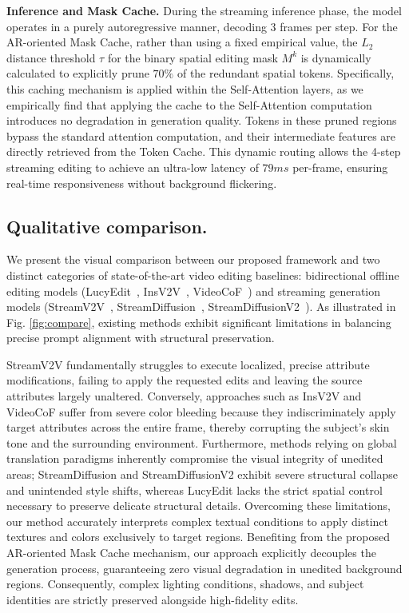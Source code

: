 \documentclass{llmxive}
\begin{document}
\noindent \textbf{Inference and Mask Cache.} During the streaming inference phase, the model operates in a purely autoregressive manner, decoding 3 frames per step. For the AR-oriented Mask Cache, rather than using a fixed empirical value, the $L_2$ distance threshold $\tau$ for the binary spatial editing mask $M^k$ is dynamically calculated to explicitly prune $70\%$ of the redundant spatial tokens. Specifically, this caching mechanism is applied within the Self-Attention layers, as we empirically find that applying the cache to the Self-Attention computation introduces no degradation in generation quality. Tokens in these pruned regions bypass the standard attention computation, and their intermediate features are directly retrieved from the Token Cache. This dynamic routing allows the 4-step streaming editing to achieve an ultra-low latency of $79ms$ per-frame, ensuring real-time responsiveness without background flickering.


\subsection{Qualitative comparison.}


\label{subsec:qualitative_comparison}

We present the visual comparison between our proposed framework and two distinct categories of state-of-the-art video editing baselines: bidirectional offline editing models (LucyEdit~\cite{decart2025lucyedit}, InsV2V~\cite{cheng2023consistent}, VideoCoF~\cite{yang2025unified}) and streaming generation models (StreamV2V~\cite{liang2024looking}, StreamDiffusion~\cite{kodaira2025streamdiffusion}, StreamDiffusionV2~\cite{feng2025streamdiffusionv2}). As illustrated in Fig. \ref{fig:compare}, existing methods exhibit significant limitations in balancing precise prompt alignment with structural preservation.

StreamV2V fundamentally struggles to execute localized, precise attribute modifications, failing to apply the requested edits and leaving the source attributes largely unaltered. Conversely, approaches such as InsV2V and VideoCoF suffer from severe color bleeding because they indiscriminately apply target attributes across the entire frame, thereby corrupting the subject's skin tone and the surrounding environment. Furthermore, methods relying on global translation paradigms inherently compromise the visual integrity of unedited areas; StreamDiffusion and StreamDiffusionV2 exhibit severe structural collapse and unintended style shifts, whereas LucyEdit lacks the strict spatial control necessary to preserve delicate structural details. Overcoming these limitations, our method accurately interprets complex textual conditions to apply distinct textures and colors exclusively to target regions. Benefiting from the proposed AR-oriented Mask Cache mechanism, our approach explicitly decouples the generation process, guaranteeing zero visual degradation in unedited background regions. Consequently, complex lighting conditions, shadows, and subject identities are strictly preserved alongside high-fidelity edits.
\end{document}
